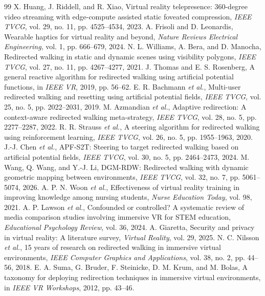 \begin{thebibliography}{99}
 X. Huang, J. Riddell, and R. Xiao, Virtual reality telepresence: 360-degree video streaming with edge-compute assisted static foveated compression, \emph{IEEE TVCG}, vol. 29, no. 11, pp. 4525--4534, 2023.
 A. Frisoli and D. Leonardis, Wearable haptics for virtual reality and beyond, \emph{Nature Reviews Electrical Engineering}, vol. 1, pp. 666--679, 2024.
 N. L. Williams, A. Bera, and D. Manocha, Redirected walking in static and dynamic scenes using visibility polygons, \emph{IEEE TVCG}, vol. 27, no. 11, pp. 4267--4277, 2021.
 J. Thomas and E. S. Rosenberg, A general reactive algorithm for redirected walking using artificial potential functions, in \emph{IEEE VR}, 2019, pp. 56--62.
 E. R. Bachmann \emph{et al.}, Multi-user redirected walking and resetting using artificial potential fields, \emph{IEEE TVCG}, vol. 25, no. 5, pp. 2022--2031, 2019.
 M. Azmandian \emph{et al.}, Adaptive redirection: A context-aware redirected walking meta-strategy, \emph{IEEE TVCG}, vol. 28, no. 5, pp. 2277--2287, 2022.
 R. R. Strauss \emph{et al.}, A steering algorithm for redirected walking using reinforcement learning, \emph{IEEE TVCG}, vol. 26, no. 5, pp. 1955--1963, 2020.
 J.-J. Chen \emph{et al.}, APF-S2T: Steering to target redirected walking based on artificial potential fields, \emph{IEEE TVCG}, vol. 30, no. 5, pp. 2464--2473, 2024.
 M. Wang, Q. Wang, and Y.-J. Li, DGM-RDW: Redirected walking with dynamic geometric mapping between environments, \emph{IEEE TVCG}, vol. 32, no. 7, pp. 5061--5074, 2026.
 A. P. N. Woon \emph{et al.}, Effectiveness of virtual reality training in improving knowledge among nursing students, \emph{Nurse Education Today}, vol. 98, 2021.
 A. P. Lawson \emph{et al.}, Confounded or controlled? A systematic review of media comparison studies involving immersive VR for STEM education, \emph{Educational Psychology Review}, vol. 36, 2024.
 A. Giaretta, Security and privacy in virtual reality: A literature survey, \emph{Virtual Reality}, vol. 29, 2025.
 N. C. Nilsson \emph{et al.}, 15 years of research on redirected walking in immersive virtual environments, \emph{IEEE Computer Graphics and Applications}, vol. 38, no. 2, pp. 44--56, 2018.
 E. A. Suma, G. Bruder, F. Steinicke, D. M. Krum, and M. Bolas, A taxonomy for deploying redirection techniques in immersive virtual environments, in \emph{IEEE VR Workshops}, 2012, pp. 43--46.

\end{thebibliography}
